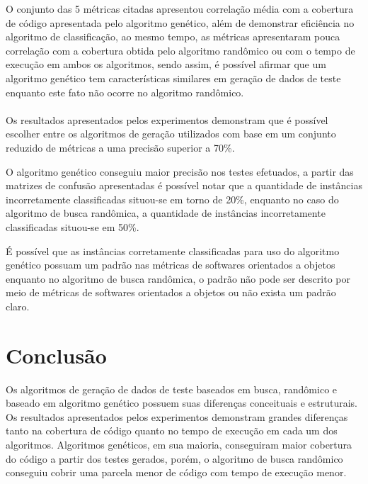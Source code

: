 \documentclass[
	12pt,				%
	oneside,			%
	a4paper,			%
	english,			%
	brazil				%
	]{abntex2ppgsi}
\begin{document}
O conjunto das 5 métricas citadas apresentou correlação média com a cobertura de código apresentada pelo algoritmo genético, além de demonstrar eficiência no algoritmo de classificação, ao mesmo tempo,  as métricas apresentaram pouca correlação com a cobertura obtida pelo algoritmo randômico ou com o tempo de execução em ambos os algoritmos, sendo assim, é possível afirmar que um algoritmo genético tem características similares em geração de dados de teste enquanto este fato não ocorre no algoritmo randômico. \\


\\

Os resultados apresentados pelos experimentos demonstram que é possível escolher entre os algoritmos de geração utilizados com base em um conjunto reduzido de métricas a uma precisão superior a 70\%.

O algoritmo genético conseguiu maior precisão nos testes efetuados, a partir das matrizes de confusão apresentadas é possível notar que a quantidade de instâncias incorretamente classificadas situou-se em torno de 20\%, enquanto no caso do algoritmo de busca randômica, a quantidade de instâncias incorretamente classificadas situou-se em 50\%.

É possível que as instâncias corretamente classificadas para uso do algoritmo genético possuam um padrão nas métricas de softwares orientados a objetos enquanto no algoritmo de busca randômica, o padrão não pode ser descrito por meio de métricas de softwares orientados a objetos ou não exista um padrão claro.


\chapter{Conclusão}
\label{chap:conclusao}

Os algoritmos de geração de dados de teste baseados em busca, randômico e baseado em algoritmo genético possuem suas diferenças conceituais e estruturais.  Os resultados apresentados pelos experimentos demonstram grandes diferenças tanto na cobertura de código quanto no tempo de execução em cada um dos algoritmos. Algoritmos genéticos, em sua maioria, conseguiram maior cobertura do código a partir dos testes gerados, porém, o algoritmo de busca randômico conseguiu cobrir uma parcela menor de código com tempo de execução menor.
\end{document}
